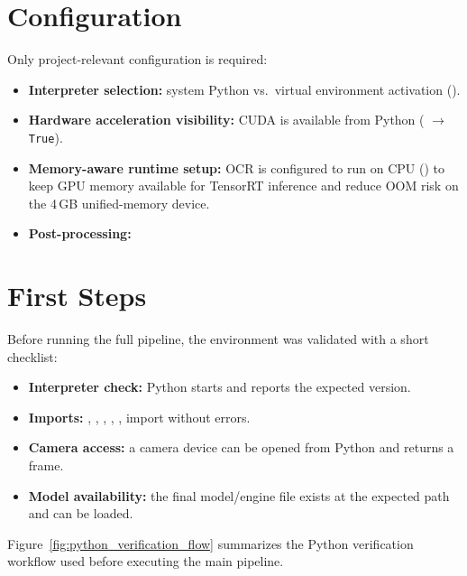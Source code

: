 \section{Configuration}
\noindent
Only project-relevant configuration is required:
\begin{itemize}
		\item \textbf{Interpreter selection:} system Python vs.\ virtual environment activation ().
		\item \textbf{Hardware acceleration visibility:} CUDA is available from Python ( $\rightarrow$ \texttt{True}).
		\item \textbf{Memory-aware runtime setup:} OCR is configured to run on CPU () to keep GPU memory available for TensorRT inference and reduce OOM risk on the 4\,GB unified-memory device.
		\item \textbf{Post-processing:} 
\end{itemize}

\section{First Steps}
\noindent
Before running the full pipeline, the environment was validated with a short checklist:
\begin{itemize}
	\item \textbf{Interpreter check:} Python starts and reports the expected version.
	\item \textbf{Imports:} , , , , ,  import without errors.
	\item \textbf{Camera access:} a camera device can be opened from Python and returns a frame.
	\item \textbf{Model availability:} the final model/engine file exists at the expected path and can be loaded.
\end{itemize}

\noindent
Figure~\ref{fig:python_verification_flow} summarizes the Python verification workflow used before executing the main pipeline.

